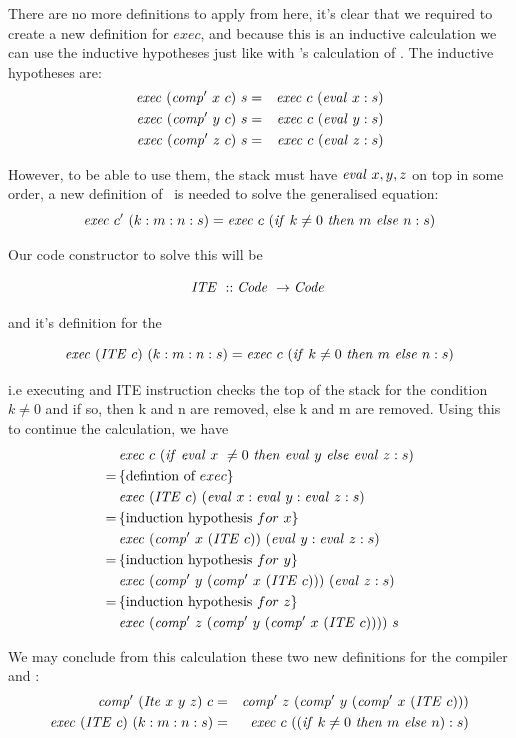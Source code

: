 \documentclass {article}
\begin{document}
There are no more definitions to apply from here,
it's clear that we required to
create a new definition for $exec$,
and because this is an inductive calculation
we can use the inductive hypotheses
just like with \BH's calculation of \add.
The inductive hypotheses are:
\begin{eqnarray*}
	\mathit{exec\ } (\mathit{comp'\ }  x\ c)\ s &=& \mathit{exec\ } c\ (\mathit{eval\ } x:s) \\
	\mathit{exec\ } (\mathit{comp'\ }  y\ c)\ s &=& \mathit{exec\ } c\ (\mathit{eval\ } y:s) \\
	\mathit{exec\ } (\mathit{comp'\ }  z\ c)\ s &=& \mathit{exec\ } c\ (\mathit{eval\ } z:s)
\end{eqnarray*}

However, to be able to use them,
the stack must have 
$\mathit{eval\ } x,y,z$ on top in some order,
a new definition of \exec\ is needed to 
solve the generalised equation:
\[ \mathit{exec\ } c'\ (k:m:n:s) 
	= \mathit{exec\ } c\ (\mathit{if\ } k \not= 0\ \mathit{then\ } m\ \mathit{else\ }  n : s)\]

Our code constructor to solve this will be

\newcommand{\ITEt}{\textit{ITE}}
\newcommand{\ITE}{\mathit{ITE\ }}

	\[ \ITE :: \Code \rightarrow \Code \]

and it's definition for the \vm

	\[ \Exec (\ITE c)\ (k:m:n:s) 
		= \Exec c\ (\ifff k \not= 0\ \tthen m\ \eelse n:s) \]

i.e executing and ITE instruction
checks the top of the stack for the condition $k \not= 0$
and if so, then k and n are removed,
else k and m are removed.
Using this to continue the calculation, we have
\begin{align*}
	&\Exec c\ (\ifff \evalf  x\ \not= 0\ \tthen \evalf  y\ \eelse \evalf  z :s) \\
	=\, & \{\mbox{defintion of}\ exec\} \\
	&\Exec (\ITE c)\ (\evalf  x:\evalf  y:\evalf  z:s) \\
	=\, & \{\mbox{induction hypothesis}\ for\ x\} \\
	&\Exec (\Compp  x\ (\ITE c))\ (\evalf  y:\evalf  z:s) \\
	=\, & \{\mbox{induction hypothesis}\ for\ y\} \\
	&\Exec (\Compp  y\ (\Compp  x\ (\ITE c)))\ (\evalf  z:s) \\
	=\, & \{\mbox{induction hypothesis}\ for\ z\} \\
	&\Exec (\Compp  z\ (\Compp  y\ (\Compp  x\ (\ITE c))))\ s
\end{align*}

We may conclude from this calculation these two new definitions
for the compiler and \vm: 
\begin{eqnarray}
	\Compp  (\Ite x\ y\ z)\ c &=&  \Compp  z\ (\Compp  y\ (\Compp  x\ (\ITE c))) \label{compite}\\
	\Exec (\ITE c)\ (k:m:n:s) &=& \Exec c\ ((\ifff k \not= 0\ \tthen m\ \eelse n):s) \label{execite}
\end{eqnarray}
\end{document}
